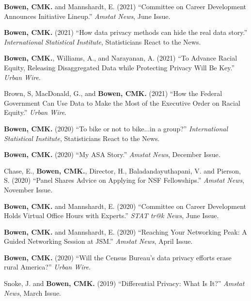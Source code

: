 \documentclass[11pt, letterpaper, roman]{moderncv} %
\begin{document}
\begin{etaremune}[topsep=0pt, itemsep=4pt, partopsep=0pt, parsep=0pt]
    \item \textbf{Bowen, CMK.} and Mannshardt, E. (2021) ``Committee on Career Development Announces Initiative Lineup.'' \textit{Amstat News}, June Issue.

    \item \textbf{Bowen, CMK.} (2021) ``How data privacy methods can hide the real data story.'' \textit{International Statistical Institute}, Statisticians React to the News.
    
    \item \textbf{Bowen, CMK.}, Williams, A., and Narayanan, A. (2021) ``To Advance Racial Equity, Releasing Disaggregated Data while Protecting Privacy Will Be Key.'' \textit{Urban Wire}. 
    
    \item Brown, S, MacDonald, G., and \textbf{Bowen, CMK.} (2021) ``How the Federal Government Can Use Data to Make the Most of the Executive Order on Racial Equity.'' \textit{Urban Wire}. 

    \item \textbf{Bowen, CMK.} (2020) ``To bike or not to bike...in a group?'' \textit{International Statistical Institute}, Statisticians React to the News.

    \item \textbf{Bowen, CMK.} (2020) ``My ASA Story.'' \textit{Amstat News}, December Issue.

    \item Chase, E., \textbf{Bowen, CMK.}, Director, H., Baladandayuthapani, V. and Pierson, S. (2020) ``Panel Shares Advice on Applying for NSF Fellowships.'' \textit{Amstat News}, November Issue.

    \item \textbf{Bowen, CMK.} and Mannshardt, E. (2020) ``Committee on Career Development Holds Virtual Office Hours with Experts.'' \textit{STAT tr@k News}, June Issue.

    \item \textbf{Bowen, CMK.} and Mannshardt, E. (2020) ``Reaching Your Networking Peak: A Guided Networking Session at JSM.'' \textit{Amstat News}, April Issue.
    
    \item \textbf{Bowen, CMK.} (2020) ``Will the Census Bureau's data privacy efforts erase rural America?'' \textit{Urban Wire}. 
    
    \item Snoke, J. and \textbf{Bowen, CMK.} (2019) ``Differential Privacy: What Is It?'' \textit{Amstat News}, March Issue.
\end{etaremune}
\end{document}
